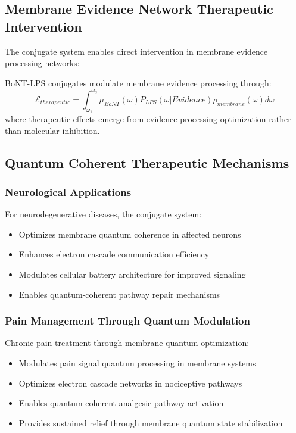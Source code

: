 \documentclass[11pt,a4paper]{article}
\begin{document}
\subsection{Membrane Evidence Network Therapeutic Intervention}

The conjugate system enables direct intervention in membrane evidence processing networks:

\begin{definition}
BoNT-LPS conjugates modulate membrane evidence processing through:
\begin{equation}
\mathcal{E}_{therapeutic} = \int_{\omega_1}^{\omega_2} \mu_{BoNT}(\omega) P_{LPS}(\omega | Evidence) \rho_{membrane}(\omega) d\omega
\end{equation}
where therapeutic effects emerge from evidence processing optimization rather than molecular inhibition.
\end{definition}

\subsection{Quantum Coherent Therapeutic Mechanisms}

\subsubsection{Neurological Applications}

For neurodegenerative diseases, the conjugate system:
\begin{itemize}
\item Optimizes membrane quantum coherence in affected neurons
\item Enhances electron cascade communication efficiency
\item Modulates cellular battery architecture for improved signaling
\item Enables quantum-coherent pathway repair mechanisms
\end{itemize}

\subsubsection{Pain Management Through Quantum Modulation}

Chronic pain treatment through membrane quantum optimization:
\begin{itemize}
\item Modulates pain signal quantum processing in membrane systems
\item Optimizes electron cascade networks in nociceptive pathways
\item Enables quantum coherent analgesic pathway activation
\item Provides sustained relief through membrane quantum state stabilization
\end{itemize}
\end{document}
